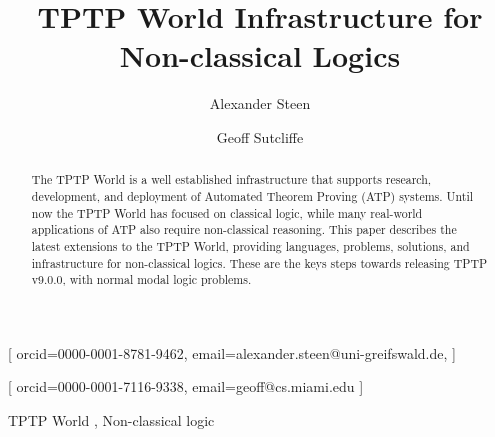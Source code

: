 \documentclass{ceurart}
\begin{document}
\title{TPTP World Infrastructure for Non-classical Logics}

\author[1]{Alexander Steen}[%
orcid=0000-0001-8781-9462,
email=alexander.steen@uni-greifswald.de,
]
\address[1]{University of Greifswald, Germany}
\author[2]{Geoff Sutcliffe}[%
orcid=0000-0001-7116-9338,
email=geoff@cs.miami.edu
]
\address[2]{University of Miami, USA}
\begin{abstract}
The TPTP World is a well established infrastructure that supports research, development, and 
deployment of Automated Theorem Proving (ATP) systems.
Until now the TPTP World has focused on classical logic, while many real-world applications of 
ATP also require non-classical reasoning. 
This paper describes the latest extensions to the TPTP World, providing languages, problems,
solutions, and infrastructure for non-classical logics.
These are the keys steps towards releasing TPTP v9.0.0, with normal modal logic problems.
\end{abstract}
\begin{keywords}
  TPTP World \sep
  Non-classical logic
\end{keywords}

% 

\maketitle
% 
\end{document}
